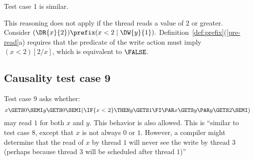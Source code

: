 Test case 1 is similar.
  
This reasoning does not apply if the thread reads a value of $2$ or greater.
Consider
\begin{math}
  (\DR{x}{2}) \prefix (x<2\mid\DW{y}{1}).
\end{math}
Definition~\ref{def:prefix}(\ref{pre-read}a) requires that the predicate
of the write action must imply $(x<2)[2/x]$, which is equivalent to $\FALSE$.


\begin{comment}
Consider the program variant:

x=0; r=x; if(r<2){y=1} || x=5

[[ y=1 ]] contains (Wy1)

[[ if(r<2){y=1} ]] contains (r<2|Wy1)

[[ r=x; if(r<2){y=1} ]] contains (Rx5)  (x<2|Wy1)  //with no order

[[ x=0; r=x; if(r<2){y=1} ]] contains (Wx0)  (Rx5)  (x<2|Wy1) //does not work, since violates (6a) 𝜆Φ′(𝑒) implies 𝜆Φ(𝑒)[𝑣/𝑥].
 

Another example:
So consider the single threaded program

x=4; x=5; r=x; if(r==4){y=1}

Clearly, this should not be able to give us Wy1.
Here is why that is not possible:

[[ y=1 ]] contains (Wy1)

[[ if(r==4){y=1} ]] contains (r==4|Wy1)

[[ r=x; if(r==4){y=1} ]] contains (Rx5)  (x==4|Wy1) // with no order

[[ x=5; r=x; if(r==4){y=1} ]] contains (Wx5)-->(Rx5)  (5==4|Wy1) // 5 is forced.
\end{comment}

  
\subsection{Causality test case 9}

Test case 9 asks whether:
\begin{displaymath}
   x\GETS 0\SEMI
   y\GETS 0\SEMI
  (\IF{x<2}\THEN y\GETS 1\FI 
  \PAR
  x\GETS y
  \PAR
  y\GETS 2\SEMI)
\end{displaymath}
may read $1$ for both $x$ and $y$.  This behavior is also allowed.  This is
``similar to test case $8$, except that $x$ is not always $0$ or
$1$. However, a compiler might determine that the read of $x$ by thread $1$
will never see the write by thread $3$ (perhaps because thread $3$ will be
scheduled after thread $1$)''

